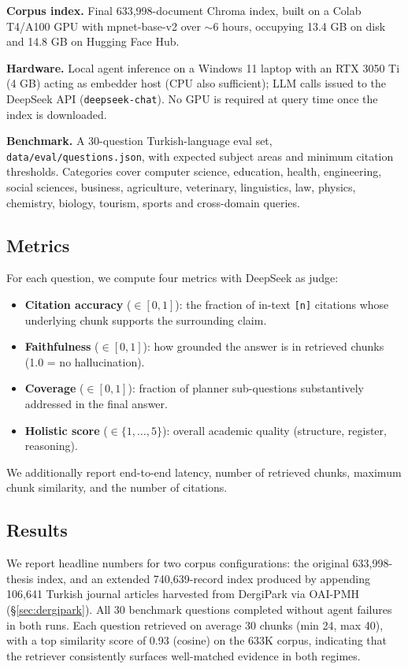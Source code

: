 \documentclass[conference]{IEEEtran}
\begin{document}
\textbf{Corpus index.} Final 633{,}998-document Chroma index, built on a
Colab T4/A100 GPU with mpnet-base-v2 over $\sim$6 hours, occupying 13.4 GB
on disk and 14.8 GB on Hugging Face Hub.

\textbf{Hardware.} Local agent inference on a Windows 11 laptop with an RTX
3050 Ti (4 GB) acting as embedder host (CPU also sufficient); LLM calls
issued to the DeepSeek API (\texttt{deepseek-chat}). No GPU is required at
query time once the index is downloaded.

\textbf{Benchmark.} A 30-question Turkish-language eval set,
\texttt{data/eval/questions.json}, with expected subject areas and minimum
citation thresholds. Categories cover computer science, education, health,
engineering, social sciences, business, agriculture, veterinary, linguistics,
law, physics, chemistry, biology, tourism, sports and cross-domain queries.

\subsection{Metrics}

For each question, we compute four metrics with DeepSeek as judge:
\begin{itemize}
\item \textbf{Citation accuracy} ($\in [0,1]$): the fraction of in-text
\texttt{[n]} citations whose underlying chunk supports the surrounding claim.
\item \textbf{Faithfulness} ($\in [0,1]$): how grounded the answer is in
retrieved chunks (1.0 = no hallucination).
\item \textbf{Coverage} ($\in [0,1]$): fraction of planner sub-questions
substantively addressed in the final answer.
\item \textbf{Holistic score} ($\in \{1,\dots,5\}$): overall academic quality
(structure, register, reasoning).
\end{itemize}
We additionally report end-to-end latency, number of retrieved chunks,
maximum chunk similarity, and the number of citations.

\subsection{Results}

We report headline numbers for two corpus configurations:
the original 633{,}998-thesis index, and an extended 740{,}639-record
index produced by appending 106{,}641 Turkish journal articles harvested
from DergiPark via OAI-PMH (\S\ref{sec:dergipark}). All 30 benchmark
questions completed without agent failures in both runs. Each question
retrieved on average 30 chunks (min 24, max 40), with a top similarity
score of 0.93 (cosine) on the 633K corpus, indicating that the retriever
consistently surfaces well-matched evidence in both regimes.
\end{document}
